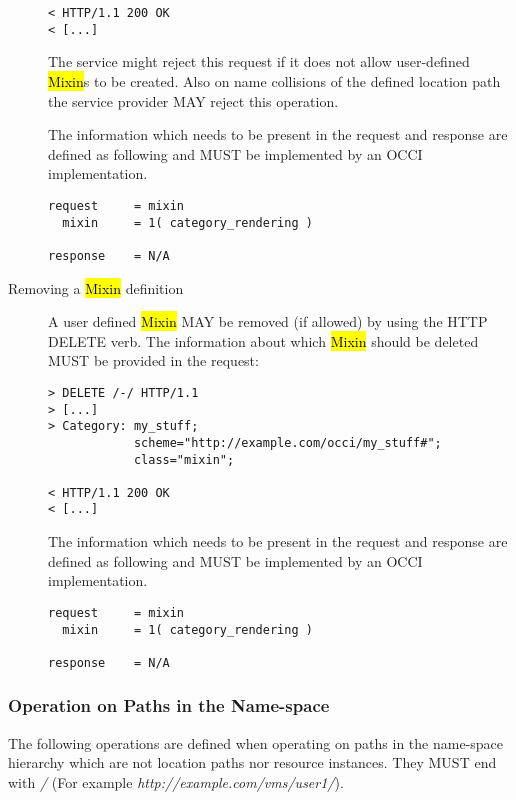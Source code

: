 \documentclass[10pt,a4paper]{article}
\begin{document}
\begin{description}
\begin{verbatim}
< HTTP/1.1 200 OK
< [...]
\end{verbatim}
    The service might reject this request if it does not allow
    user-defined \hl{Mixin}s to be created. Also on name collisions of
    the defined location path the service provider MAY reject this
    operation.

    The information which needs to be present in the request and
    response are defined as following and MUST be implemented by an
    OCCI implementation.

\begin{verbatim}
request     = mixin
  mixin     = 1( category_rendering )

response    = N/A
\end{verbatim}

  \item[Removing a \hl{Mixin} definition] A user defined \hl{Mixin}
    MAY be removed (if allowed) by using the HTTP DELETE verb. The
    information about which \hl{Mixin} should be deleted MUST be
    provided in the request:
\begin{verbatim}
> DELETE /-/ HTTP/1.1
> [...]
> Category: my_stuff; 
            scheme="http://example.com/occi/my_stuff#"; 
            class="mixin";

< HTTP/1.1 200 OK
< [...]
\end{verbatim}

    The information which needs to be present in the request and
    response are defined as following and MUST be implemented by an
    OCCI implementation.

\begin{verbatim}
request     = mixin
  mixin     = 1( category_rendering )

response    = N/A
\end{verbatim}

\end{description}

%
%

\subsubsection{Operation on Paths in the Name-space}
The following operations are defined when operating on paths in the
name-space hierarchy which are not location paths nor resource
instances. They MUST end with \emph{/} (For example
\emph{http://example.com/vms/user1/}).
\end{document}
